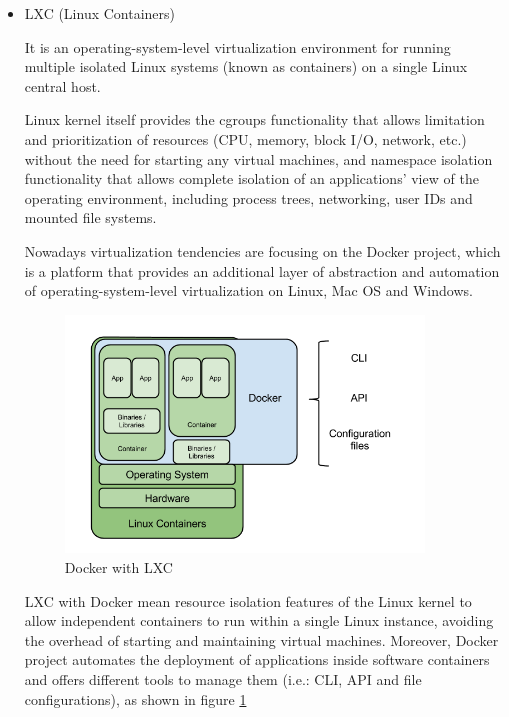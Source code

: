 \begin{itemize}
\item LXC (Linux Containers) \hfill

It is an operating-system-level virtualization environment for running multiple isolated Linux systems (known as containers) on a single Linux central host.

Linux kernel itself provides the cgroups functionality that allows limitation and prioritization of resources (CPU, memory, block I/O, network, etc.) without the need for starting any virtual machines, and namespace isolation functionality that allows complete isolation of an applications' view of the operating environment, including process trees, networking, user IDs and mounted file systems.

Nowadays virtualization tendencies are focusing on the Docker project, which is a platform that provides an additional layer of abstraction and automation of operating-system-level virtualization on Linux, Mac OS and Windows.
\begin{figure}[!htb]
\begin{center}
\includegraphics[width=0.9\textwidth]{./images/LXC.png}
\caption{Docker with LXC}
\label{F:DockerAndLXC}
\end{center}
\end{figure}

LXC with Docker mean resource isolation features of the Linux kernel to allow independent containers to run within a single Linux instance, avoiding the overhead of starting and maintaining virtual machines. Moreover, Docker project automates the deployment of applications inside software containers and offers different tools to manage them (i.e.: CLI, API and file configurations), as shown in figure \ref{F:DockerAndLXC} 
\end{itemize}

